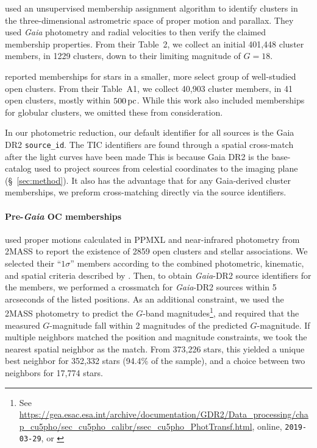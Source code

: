 \documentclass[12pt,twocolumn,tighten]{aastex62}
\begin{document}
\citet{cantat-gaudin_gaia_2018} used an unsupervised membership
assignment algorithm to identify clusters in the three-dimensional
astrometric space of proper motion and parallax. They used {\it Gaia}
photometry and radial velocities to then verify the claimed
membership properties.  From their Table~2, we collect an initial 401{,}448
cluster members, in 1229 clusters, down to their limiting magnitude of
$G=18$.

\citet{gaia_hr_2018} reported memberships for stars in a smaller, more
select group of well-studied open clusters. From their Table~A1, we
collect 40{,}903 cluster members, in 41 open clusters, mostly within
$500\,{\rm pc}$. While this work also included memberships for
globular clusters, we omitted these from consideration.

In our photometric reduction,  our default identifier for all sources
is the Gaia DR2 \texttt{source\_id}.
The TIC identifiers are found through a spatial cross-match after the light 
curves have been made
\citep{stassun_TIC_2018,stassun_TIC8_2019}
This is because Gaia DR2 is the base-catalog used to project
sources from celestial coordinates to the imaging plane (\S~\ref{sec:method}).
It also has the advantage that for any Gaia-derived cluster memberships, 
we preform cross-matching directly via the source identifiers.



\paragraph{Pre-{\it Gaia} OC memberships}
\citet{Kharchenko_et_al_2013} used proper motions calculated in PPMXL
\citep[][a combination of USNO-B1{.}0 and 2MASS
astrometry]{roeser_ppmxl_2010} and near-infrared photometry from 2MASS
\citep{skrutskie_tmass_2006} to report the existence of 2859 open
clusters and stellar associations.
We selected their ``$1\sigma$'' members according to the
combined photometric, kinematic, and spatial criteria described by
\citet{kharchenko_global_2012}.  Then, to obtain {\it Gaia}-DR2 source
identifiers for the members, we performed a crossmatch for {\it
Gaia}-DR2 sources within 5 arcseconds of the listed positions.  As an
additional constraint, we used the 2MASS photometry to predict the
$G$-band magnitudes\footnote{See
\url{https://gea.esac.esa.int/archive/documentation/GDR2/Data_processing/chap_cu5pho/sec_cu5pho_calibr/ssec_cu5pho_PhotTransf.html},
online, \texttt{2019-03-29}, or \citet{carrasco_gaia_2016}}, and
required that the measured $G$-magnitude fall within 2 magnitudes of
the predicted $G$-magnitude.  If multiple neighbors matched the
position and magnitude constraints, we took the nearest spatial
neighbor as the match.  From 373{,}226 stars, this yielded a unique
best neighbor for 352{,}332 stars (94.4\% of the sample), and a choice
between two neighbors for 17{,}774 stars. 
\end{document}
